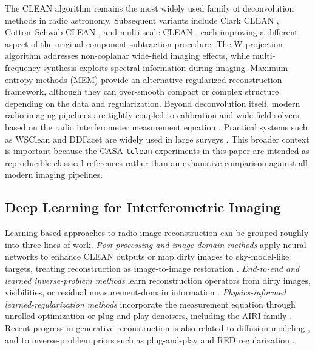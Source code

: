 \documentclass[twocolumn]{aastex631}
\begin{document}
The CLEAN algorithm \citep{Hogbom1974} remains the most widely used family of deconvolution methods in radio astronomy.
Subsequent variants include Clark CLEAN \citep{Clark1980}, Cotton--Schwab CLEAN \citep{Schwab1984}, and multi-scale CLEAN \citep{Cornwell2008}, each improving a different aspect of the original component-subtraction procedure.
The W-projection algorithm \citep{Cornwell2008WProjection} addresses non-coplanar wide-field imaging effects, while multi-frequency synthesis \citep{Rau2011} exploits spectral information during imaging.
Maximum entropy methods (MEM) \citep{Cornwell1985} provide an alternative regularized reconstruction framework, although they can over-smooth compact or complex structure depending on the data and regularization.
Beyond deconvolution itself, modern radio-imaging pipelines are tightly coupled to calibration and wide-field solvers based on the radio interferometer measurement equation \citep{Smirnov2011}.
Practical systems such as WSClean and DDFacet are widely used in large surveys \citep{Offringa2014,Tasse2018}.
This broader context is important because the CASA \texttt{tclean} experiments in this paper are intended as reproducible classical references rather than an exhaustive comparison against all modern imaging pipelines.

\subsection{Deep Learning for Interferometric Imaging}

Learning-based approaches to radio image reconstruction can be grouped roughly into three lines of work.
\emph{Post-processing and image-domain methods} apply neural networks to enhance CLEAN outputs or map dirty images to sky-model-like targets, treating reconstruction as image-to-image restoration \citep{Gheller2018,Schmidt2022,Geyer2023,Zhou2025UNet}.
\emph{End-to-end and learned inverse-problem methods} learn reconstruction operators from dirty images, visibilities, or residual measurement-domain information \citep{Connor2022,Aghabiglou2024,Wang2023VICDDPM}.
\emph{Physics-informed learned-regularization methods} incorporate the measurement equation through unrolled optimization or plug-and-play denoisers, including the AIRI family \citep{Terris2022,Terris2025AIRI}.
Recent progress in generative reconstruction is also related to diffusion modeling \citep{Ho2020DDPM,Song2021ScoreSDE}, and to inverse-problem priors such as plug-and-play and RED regularization \citep{Venkatakrishnan2013,Romano2017}.
\end{document}
